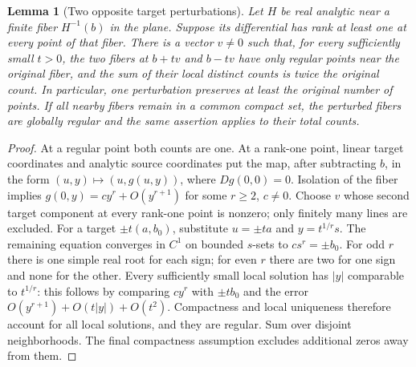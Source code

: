 \documentclass[UTF8,11pt]{ctexart}
\newtheorem{lem}[thm]{Lemma}
\theoremstyle{definition}
\numberwithin{equation}{section}
\begin{document}
\begin{lem}[Two opposite target perturbations]
\label{v13:lem:opposite}
Let $H$ be real analytic near a finite fiber $H^{-1}(b)$ in the
plane. Suppose its differential has rank at least one at every
point of that fiber. There is a vector $v\ne0$ such that, for
every sufficiently small $t>0$, the two fibers at $b+tv$ and
$b-tv$ have only regular points near the original fiber, and
the sum of their local distinct counts is twice the original
count. In particular, one perturbation preserves at least the
original number of points. If all nearby fibers remain in a
common compact set, the perturbed fibers are globally regular
and the same assertion applies to their total counts.
\end{lem}
\begin{proof}
At a regular point both counts are one. At a rank-one point,
linear target coordinates and analytic source coordinates put
the map, after subtracting $b$, in the form
$(u,y)\mapsto(u,g(u,y))$, where $Dg(0,0)=0$.
Isolation of the fiber implies
$g(0,y)=cy^r+O(y^{r+1})$ for some $r\ge2$, $c\ne0$.
Choose $v$ whose second target component at every rank-one
point is nonzero; only finitely many lines are excluded.
For a target $\pm t(a,b_0)$, substitute $u=\pm ta$ and
$y=t^{1/r}s$. The remaining equation converges in $C^1$ on
bounded $s$-sets to $cs^r=\pm b_0$.
For odd $r$ there is one simple real root for each sign; for
even $r$ there are two for one sign and none for the other.
Every sufficiently small local solution has $|y|$ comparable
to $t^{1/r}$: this follows by comparing $cy^r$ with
$\pm tb_0$ and the error
$O(y^{r+1})+O(t|y|)+O(t^2)$. Compactness and local uniqueness
therefore account for all local solutions, and they are regular.
Sum over disjoint neighborhoods. The final compactness
assumption excludes additional zeros away from them.
\end{proof}
\end{document}
